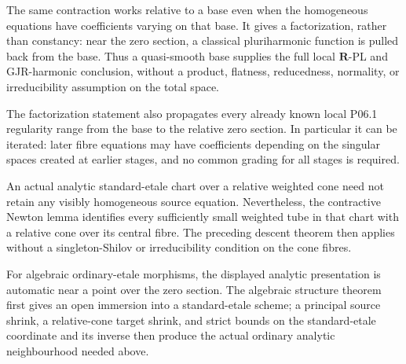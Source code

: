 


The same contraction works relative to a base even when the homogeneous
equations have coefficients varying on that base.  It gives a factorization,
rather than constancy: near the zero section, a classical pluriharmonic
function is pulled back from the base.  Thus a quasi-smooth base supplies the
full local \(\mathbf R\)-PL and GJR-harmonic conclusion, without a product,
flatness, reducedness, normality, or irreducibility assumption on the total
space.




The factorization statement also propagates every already known local
P06.1 regularity range from the base to the relative zero section.  In
particular it can be iterated: later fibre equations may have coefficients
depending on the singular spaces created at earlier stages, and no common
grading for all stages is required.





An actual analytic standard-etale chart over a relative weighted cone need
not retain any visibly homogeneous source equation.  Nevertheless, the
contractive Newton lemma identifies every sufficiently small weighted tube
in that chart with a relative cone over its central fibre.  The preceding
descent theorem then applies without a singleton-Shilov or irreducibility
condition on the cone fibres.





For algebraic ordinary-etale morphisms, the displayed analytic presentation
is automatic near a point over the zero section.  The algebraic structure
theorem first gives an open immersion into a standard-etale scheme; a
principal source shrink, a relative-cone target shrink, and strict bounds on
the standard-etale coordinate and its inverse then produce the actual
ordinary analytic neighbourhood needed above.

